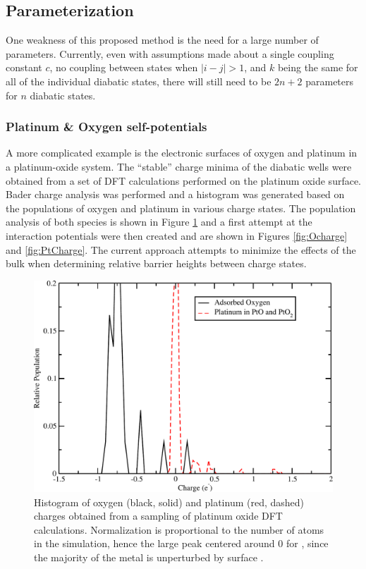 \subsection{Parameterization}
One weakness of this proposed method is the need for a large number of
parameters.  Currently, even with assumptions made about a single coupling
constant $c$, no coupling between states when $|i-j| > 1$, and $k$ being the
same for all of the individual diabatic states, there will still need to be
$2n+2$ parameters for $n$ diabatic states. 


\subsubsection{Platinum \& Oxygen self-potentials}
A more complicated example is the electronic surfaces
of oxygen and platinum in a platinum-oxide system.  The ``stable'' charge minima of the diabatic wells
were obtained from a set of DFT calculations performed on
the platinum oxide surface. Bader charge analysis was performed and a histogram
was generated based on the populations of oxygen and platinum in various charge
states. The population analysis of both species is shown in Figure
\ref{fig:population} and a first attempt at the interaction potentials were
then created and are shown in Figures \ref{fig:Ocharge} and \ref{fig:PtCharge}.
The current approach attempts to minimize the effects of the bulk  when
determining relative barrier heights between charge states.

\begin{figure}
  \centering
  \includegraphics[width=0.75\linewidth]{../figures/chap5/chgDist_PtO.pdf}
  \caption{Histogram of oxygen (black, solid) and platinum (red, dashed)
charges obtained from a sampling of platinum oxide DFT calculations.
Normalization is proportional to the number of atoms in the simulation, hence the
large peak centered around 0 for , since the majority of the metal is
unperturbed by surface .}
\label{fig:population}
\end{figure}

